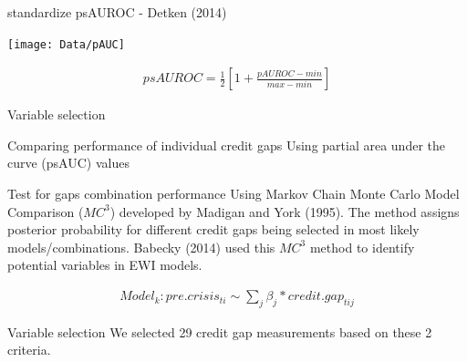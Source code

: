\documentclass[
  ignorenonframetext,
]{beamer}
\begin{document}
\begin{frame}{standardize psAUROC - Detken (2014)}
\protect\hypertarget{standardize-psauroc---detken-2014}{}
\begin{center}\texttt{[image: Data/pAUC]} \end{center}

\begin{align}
psAUROC = \frac{1}{2}\left[ 1+ \frac{pAUROC - min}{max - min}\right]
\end{align}
\end{frame}

\begin{frame}{Variable selection}
\protect\hypertarget{variable-selection}{}
\begin{block}{Comparing performance of individual credit gaps}
\protect\hypertarget{comparing-performance-of-individual-credit-gaps}{}
Using partial area under the curve (psAUC) values
\end{block}

\begin{block}{Test for gaps combination performance}
\protect\hypertarget{test-for-gaps-combination-performance}{}
Using Markov Chain Monte Carlo Model Comparison (\(MC^3\)) developed by
Madigan and York (1995). The method assigns posterior probability for
different credit gaps being selected in most likely models/combinations.
Babecky (2014) used this \(MC^3\) method to identify potential variables
in EWI models.

\begin{align*}
Model_k :  pre.crisis_{ti} \sim \sum\nolimits_j \beta_j * credit.gap_{tij}
\end{align*}
\end{block}

\begin{block}{Variable selection}
\protect\hypertarget{variable-selection-1}{}
We selected 29 credit gap measurements based on these 2 criteria.
\end{block}
\end{frame}
\end{document}
